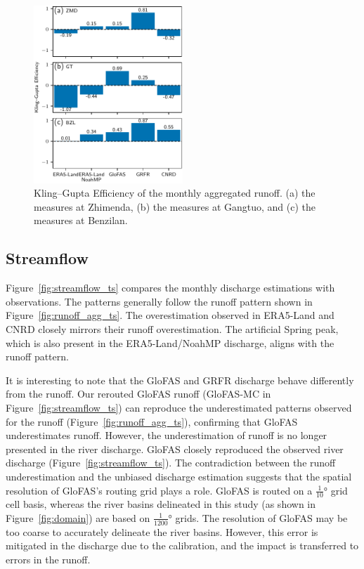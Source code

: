 \documentclass[preprint, review, authoryear, longtitle, 12pt, 3p]{elsarticle}
\begin{document}
\begin{figure}[ht!]
  \centering
  \includegraphics[width=0.5\textwidth]{runoff_agg_kge_mon.pdf}
  \caption{Kling--Gupta Efficiency of the monthly aggregated runoff. (a) the measures at Zhimenda, (b) the measures at Gangtuo, and (c) the measures at Benzilan.}
  \label{fig:runoff_kge}
\end{figure}

\subsection{Streamflow}

Figure~\ref{fig:streamflow_ts} compares the monthly discharge estimations with observations. The patterns generally follow the runoff pattern shown in Figure~\ref{fig:runoff_agg_ts}. The overestimation observed in ERA5-Land and CNRD closely mirrors their runoff overestimation. The artificial Spring peak, which is also present in the ERA5-Land/NoahMP discharge, aligns with the runoff pattern.

It is interesting to note that the GloFAS and GRFR discharge behave differently from the runoff. Our rerouted GloFAS runoff (GloFAS-MC in Figure~\ref{fig:streamflow_ts}) can reproduce the underestimated patterns observed for the runoff (Figure~\ref{fig:runoff_agg_ts}), confirming that GloFAS underestimates runoff. However, the underestimation of runoff is no longer presented in the river discharge. GloFAS closely reproduced the observed river discharge (Figure~\ref{fig:streamflow_ts}). The contradiction between the runoff underestimation and the unbiased discharge estimation suggests that the spatial resolution of GloFAS's routing grid plays a role. GloFAS is routed on a $\frac{1}{10}$° grid cell basis, whereas the river basins delineated in this study (as shown in Figure~\ref{fig:domain}) are based on $\frac{1}{1200}$° grids. The resolution of GloFAS may be too coarse to accurately delineate the river basins. However, this error is mitigated in the discharge due to the calibration, and the impact is transferred to errors in the runoff.
\end{document}
